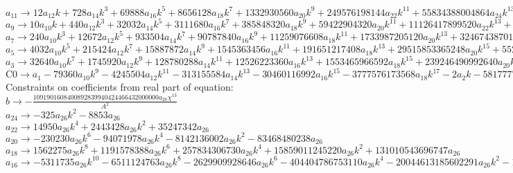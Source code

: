 \documentclass[12pt,a4paper,draft]{article}
\begin{document}
$a_{11}\to 12 a_{12} k+728 a_{14} k^3+69888 a_{16} k^5+8656128 a_{18} k^7+1332930560 a_{20} k^9+249576198144 a_{22} k^{11}+55834388004864 a_{24} k^{13}+14708733593681920 a_{26} k^{15}$\\
$a_{9}\to 10 a_{10} k+440 a_{12} k^3+32032 a_{14} k^5+3111680 a_{16} k^7+385848320 a_{18} k^9+59422904320 a_{20} k^{11}+11126417899520 a_{22} k^{13}+2489170300469248 a_{24} k^{15}+655734757395660800 a_{26} k^{17}$\\
$a_{7}\to 240 a_{10} k^3+12672 a_{12} k^5+933504 a_{14} k^7+90787840 a_{16} k^9+11259076608 a_{18} k^{11}+1733987205120 a_{20} k^{13}+324674387017728 a_{22} k^{15}+72635234665365504 a_{24} k^{17}+19134668627220889600 a_{26} k^{19}+8 a_{8} k$\\
$a_{5}\to 4032 a_{10} k^5+215424 a_{12} k^7+15887872 a_{14} k^9+1545363456 a_{16} k^{11}+191651217408 a_{18} k^{13}+29515853365248 a_{20} k^{15}+5526593941929984 a_{22} k^{17}+1236393972835811328 a_{24} k^{19}+325709541934503034880 a_{26} k^{21}+6 a_{6} k+112 a_{8} k^3$\\
$a_{3}\to 32640 a_{10} k^7+1745920 a_{12} k^9+128780288 a_{14} k^{11}+12526223360 a_{16} k^{13}+1553465966592 a_{18} k^{15}+239246490992640 a_{20} k^{17}+44796883073761280 a_{22} k^{19}+10021832059523170304 a_{24} k^{21}+2640102104917816115200 a_{26} k^{23}+4 a_{4} k+40 a_{6} k^3+896 a_{8} k^5$\\
$\text{C0}\to a_{1}-79360 a_{10} k^9-4245504 a_{12} k^{11}-313155584 a_{14} k^{13}-30460116992 a_{16} k^{15}-3777576173568 a_{18} k^{17}-2 a_{2} k-581777702256640 a_{20} k^{19}-108932957168730112 a_{22} k^{21}-24370173276164456448 a_{24} k^{23}-6419958484945407574016 a_{26} k^{25}-8 a_{4} k^3-96 a_{6} k^5-2176 a_{8} k^7$\\
Constraints on coefficients from real part of equation:
\\$b\to -\frac{1091901608400892839940424466432000000 a_{26} \chi ^{13}}{A^2}$\\
$a_{24}\to -325 a_{26} k^2-8853 a_{26}$\\
$a_{22}\to 14950 a_{26} k^4+2443428 a_{26} k^2+35247342 a_{26}$\\
$a_{20}\to -230230 a_{26} k^6-94071978 a_{26} k^4-8142136002 a_{26} k^2-83468480238 a_{26}$\\
$a_{18}\to 1562275 a_{26} k^8+1191578388 a_{26} k^6+257834306730 a_{26} k^4+15859011245220 a_{26} k^2+131010543696747 a_{26}$\\
$a_{16}\to -5311735 a_{26} k^{10}-6511124763 a_{26} k^8-2629909928646 a_{26} k^6-404404786753110 a_{26} k^4-20044613185602291 a_{26} k^2-143746327179098943 a_{26}$\\
\end{document}

